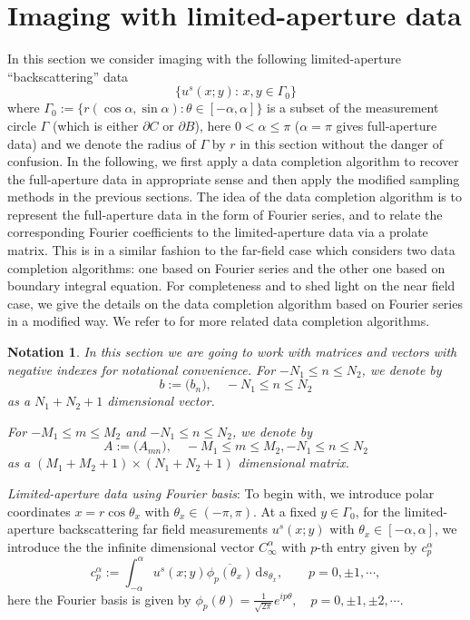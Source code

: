 \documentclass[final]{siamltex}
\newtheorem{notation}[theorem]{Notation}
\newcommand{\ind}{\,\mbox{d}}
\begin{document}
\section{Imaging with limited-aperture data} \label{section limited-aperture}
In this section we consider imaging with the following limited-aperture ``backscattering'' data
\begin{equation}\label{def limited data}
\{u^s(x;y): \, x,y\in \Gamma_0 \}
\end{equation}
where $\Gamma_0:=\{r(\cos \alpha,\sin\alpha): \theta \in [-\alpha,\alpha]\}$ is a subset of the measurement circle $\Gamma$ (which is either $\partial C$ or $\partial B$), here $0<\alpha\le\pi$ ($\alpha=\pi$ gives full-aperture data) and we denote the radius of $\Gamma$ by $r$ in this section without the danger of confusion.  In the following, we first apply a data completion algorithm  to recover the full-aperture data in appropriate sense and then apply the modified sampling methods in the previous sections. The idea of the data completion algorithm is to represent the full-aperture data in the form of  Fourier series, and to relate the corresponding Fourier coefficients to the limited-aperture data via a prolate matrix.  This is in a similar fashion to the far-field case \cite{DLMZ2021} which considers two data completion algorithms: one based on Fourier series and the other one based on boundary integral equation. For completeness and to shed light on the near field case, we give the details on the data completion algorithm based on Fourier series in a modified way. We refer to \cite{DLMZ2021} for more related data completion algorithms.

\begin{notation}
In this section we are going to work with matrices and vectors with negative indexes for notational convenience. For $-N_1\le n\le N_2$, we denote by
$$
b:=\Big(b_n\Big), \quad -N_1\le n\le N_2
$$
as a $N_1+N_2+1$ dimensional vector.

For $-M_1\le m\le M_2$ and $-N_1\le n\le N_2$, we denote by
$$
A:=\Big(A_{mn}\Big), \quad -M_1\le m\le M_2, -N_1\le n\le N_2
$$
as a $(M_1+M_2+1) \times (N_1+N_2+1)$ dimensional matrix.

\end{notation}


\vspace{1\baselineskip}

\noindent\textit{Limited-aperture data using Fourier basis}: To begin with,  we introduce polar coordinates $x=r \cos \theta_x$  with $\theta_x \in (-\pi,\pi)$. At a fixed $y \in \Gamma_0$, for the limited-aperture backscattering far field measurements $u^{s}(x;y)$ with
$\theta_x \in [-\alpha, \alpha]$, we introduce the the infinite dimensional vector $C^\alpha_\infty$ with $p$-th entry given by $c^\alpha_{p}$
\begin{equation} \label{def C alpha}
c_{p}^{\alpha}:=\int_{-\alpha}^\alpha  u^{s}(x;y) \overline{\phi_p(\theta_x)  } \ind s_{\theta_x} ,\qquad p = 0, \pm 1,\cdots,
\end{equation}
here the Fourier basis is given by $\phi_p(\theta) = \frac{1}{\sqrt{2\pi}}e^{ip\theta}, \quad p=0, \pm1, \pm2,\cdots$.
\end{document}
